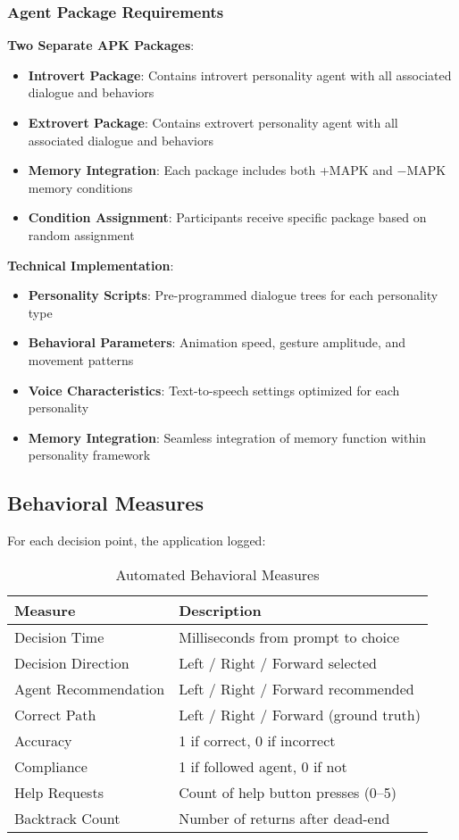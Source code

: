 \documentclass[12pt]{article}
\begin{document}
\subsubsection{Agent Package Requirements}

\textbf{Two Separate APK Packages}:
\begin{itemize}
    \item \textbf{Introvert Package}: Contains introvert personality agent with all associated dialogue and behaviors
    \item \textbf{Extrovert Package}: Contains extrovert personality agent with all associated dialogue and behaviors
    \item \textbf{Memory Integration}: Each package includes both +MAPK and $-$MAPK memory conditions
    \item \textbf{Condition Assignment}: Participants receive specific package based on random assignment
\end{itemize}

\textbf{Technical Implementation}:
\begin{itemize}
    \item \textbf{Personality Scripts}: Pre-programmed dialogue trees for each personality type
    \item \textbf{Behavioral Parameters}: Animation speed, gesture amplitude, and movement patterns
    \item \textbf{Voice Characteristics}: Text-to-speech settings optimized for each personality
    \item \textbf{Memory Integration}: Seamless integration of memory function within personality framework
\end{itemize}

\subsection{Behavioral Measures}

For each decision point, the application logged:

\begin{table}[h]
\centering
\caption{Automated Behavioral Measures}
\begin{tabular}{p{}p{}}
\toprule
\textbf{Measure} & \textbf{Description} \\
\midrule
Decision Time & Milliseconds from prompt to choice \\
Decision Direction & Left / Right / Forward selected \\
Agent Recommendation & Left / Right / Forward recommended \\
Correct Path & Left / Right / Forward (ground truth) \\
Accuracy & 1 if correct, 0 if incorrect \\
Compliance & 1 if followed agent, 0 if not \\
Help Requests & Count of help button presses (0--5) \\
Backtrack Count & Number of returns after dead-end \\
\bottomrule
\end{tabular}
\end{table}
\end{document}
